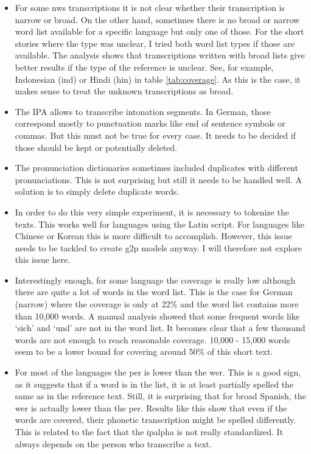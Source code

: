 \begin{itemize}
\item For some \ac{nws} transcriptions it is not clear whether their transcription is narrow or broad. On the other hand, sometimes there is no broad or narrow word list available for a specific language but only one of those. For the short stories where the type was unclear, I tried both word list types if those are available. The analysis shows that transcriptions written with broad lists give better results if the type of the reference is unclear. See, for example, Indonesian (ind) or Hindi (hin) in table \ref{tab:coverage}. As this is the case, it makes sense to treat the unknown transcriptions as broad. 
\item The IPA allows to transcribe intonation segments. In German, those correspond mostly to punctuation marks like end of sentence symbols or commas. But this must not be true for every case. It needs to be decided if those should be kept or potentially deleted.
\item The pronunciation dictionaries sometimes included duplicates with different pronunciations. This is not surprising but still it needs to be handled well. A solution is to simply delete duplicate words.
\item In order to do this very simple experiment, it is necessary to tokenize the texts. This works well for languages using the Latin script. For languages like Chinese or Korean this is more difficult to accomplish. However, this issue needs to be tackled to create \ac{g2p} models anyway. I will therefore not explore this issue here.
\item Interestingly enough, for some language the coverage is really low although there are quite a lot of words in the word list. This is the case for German (narrow) where the coverage is only at 22\% and the word list contains more than 10,000 words. A manual analysis showed that some frequent words like `sich' and `und' are not in the word list. It becomes clear that a few thousand words are not enough to reach reasonable coverage. 10,000 - 15,000 words seem to be a lower bound for covering around 50\% of this short text.
\item For most of the languages the \ac{per} is lower than the \ac{wer}. This is a good sign, as it suggests that if a word is in the list, it is at least partially spelled the same as in the reference text. Still, it is surprising that for broad Spanish, the \ac{wer} is actually lower than the \ac{per}. Results like this show that even if the words are covered, their phonetic transcription might be spelled differently. This is related to the fact that the \ac{ipalpha} is not really standardized. It always depends on the person who transcribe a text.
\end{itemize}

